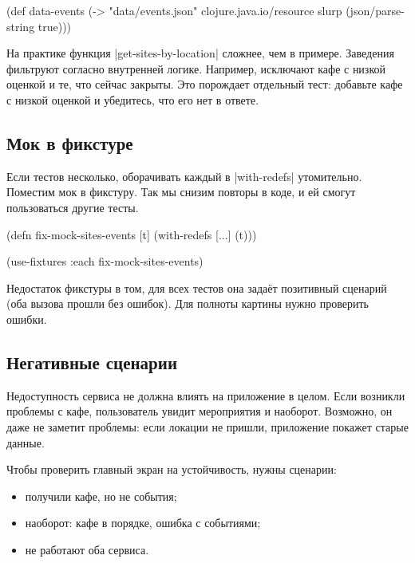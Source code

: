 
\begin{english}
  \begin{clojure}
(def data-events
  (-> "data/events.json"
      clojure.java.io/resource
      slurp
      (json/parse-string true)))
  \end{clojure}
\end{english}

На практике функция \spverb|get-sites-by-location| сложнее, чем в
примере. Заведения фильтруют согласно внутренней логике. Например, исключают
кафе с низкой оценкой и те, что сейчас закрыты. Это порождает отдельный тест:
добавьте кафе с низкой оценкой и убедитесь, что его нет в ответе.

\subsection{Мок в фикстуре}


Если тестов несколько, оборачивать каждый в \spverb|with-redefs|
утомительно. Поместим мок в фикстуру. Так мы снизим повторы в коде, и ей смогут
пользоваться другие тесты.

\begin{english}
  \begin{clojure}
(defn fix-mock-sites-events [t]
  (with-redefs [...]
    (t)))

(use-fixtures :each fix-mock-sites-events)
  \end{clojure}
\end{english}

Недостаток фикстуры в том, для всех тестов она зада\"{е}т позитивный сценарий (оба
вызова прошли без ошибок). Для полноты картины нужно проверить ошибки.

\subsection{Негативные сценарии}


Недоступность сервиса не должна влиять на приложение в целом. Если возникли
проблемы с кафе, пользователь увидит мероприятия и наоборот. Возможно, он даже
не заметит проблемы: если локации не пришли, приложение покажет старые данные.

Чтобы проверить главный экран на устойчивость, нужны сценарии:

\begin{itemize}

\item
  получили кафе, но не события;

\item
  наоборот: кафе в порядке, ошибка с событиями;

\item
  не работают оба сервиса.

\end{itemize}

